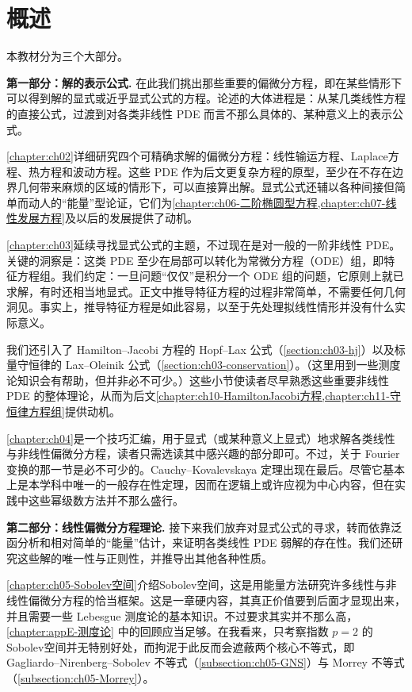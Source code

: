 \documentclass[../../main.tex]{subfiles}
\begin{document}
\section{概述}\label{section:ch01-overview}

本教材分为三个大部分。

\textbf{第一部分：解的表示公式.} 在此我们挑出那些重要的偏微分方程，即在某些情形下可以得到解的显式或近乎显式公式的方程。论述的大体进程是：从某几类线性方程的直接公式，过渡到对各类非线性 PDE 而言不那么具体的、某种意义上的表示公式。

\cref{chapter:ch02}详细研究四个可精确求解的偏微分方程：线性输运方程、Laplace方程、热方程和波动方程。这些 PDE 作为后文更复杂方程的原型，至少在不存在边界几何带来麻烦的区域的情形下，可以直接算出解。显式公式还辅以各种间接但简单而动人的``能量''型论证，它们为\cref{chapter:ch06-二阶椭圆型方程,chapter:ch07-线性发展方程}及以后的发展提供了动机。

\cref{chapter:ch03}延续寻找显式公式的主题，不过现在是对一般的一阶非线性 PDE。关键的洞察是：这类 PDE 至少在局部可以转化为常微分方程（ODE）组，即特征方程组。我们约定：一旦问题``仅仅''是积分一个 ODE 组的问题，它原则上就已求解，有时还相当地显式。正文中推导特征方程的过程非常简单，不需要任何几何洞见。事实上，推导特征方程是如此容易，以至于先处理拟线性情形并没有什么实际意义。

我们还引入了 Hamilton--Jacobi 方程的 Hopf--Lax 公式（\cref{section:ch03-hj}）以及标量守恒律的 Lax--Oleinik 公式（\cref{section:ch03-conservation}）。（这里用到一些测度论知识会有帮助，但并非必不可少。）这些小节使读者尽早熟悉这些重要非线性 PDE 的整体理论，从而为后文\cref{chapter:ch10-HamiltonJacobi方程,chapter:ch11-守恒律方程组}提供动机。

\cref{chapter:ch04}是一个技巧汇编，用于显式（或某种意义上显式）地求解各类线性与非线性偏微分方程，读者只需选读其中感兴趣的部分即可。不过，关于 Fourier 变换的那一节是必不可少的。Cauchy--Kovalevskaya 定理出现在最后。尽管它基本上是本学科中唯一的一般存在性定理，因而在逻辑上或许应视为中心内容，但在实践中这些幂级数方法并不那么盛行。

\textbf{第二部分：线性偏微分方程理论.} 接下来我们放弃对显式公式的寻求，转而依靠泛函分析和相对简单的``能量''估计，来证明各类线性 PDE 弱解的存在性。我们还研究这些解的唯一性与正则性，并推导出其他各种性质。

\cref{chapter:ch05-Sobolev空间}介绍Sobolev空间，这是用能量方法研究许多线性与非线性偏微分方程的恰当框架。这是一章硬内容，其真正价值要到后面才显现出来，并且需要一些 Lebesgue 测度论的基本知识。不过要求其实并不那么高，\cref{chapter:appE-测度论} 中的回顾应当足够。在我看来，只考察指数 $p=2$ 的Sobolev空间并无特别好处，而拘泥于此反而会遮蔽两个核心不等式，即 Gagliardo--Nirenberg--Sobolev 不等式（\cref{subsection:ch05-GNS}）与 Morrey 不等式（\cref{subsection:ch05-Morrey}）。
\end{document}
